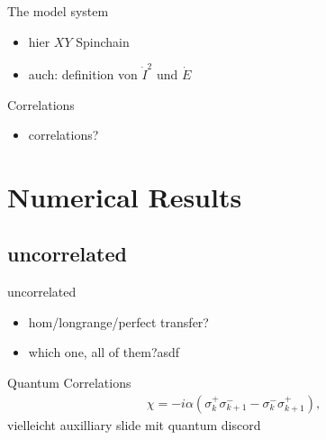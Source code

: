 \documentclass[10pt]{beamer}
\begin{document}
\begin{frame}{The model system}
    \begin{itemize}
        \item hier $XY$ Spinchain
        \item auch: definition von $\dot{I}^2$ und $\dot{E}$
    \end{itemize}
\end{frame}

\begin{frame}{Correlations}
    \begin{itemize}
        \item correlations?
    \end{itemize}
\end{frame}

\section[Numerical Results]{Numerical Results}

\subsection{uncorrelated}

\begin{frame}{uncorrelated}
    \begin{itemize}
        \item hom/longrange/perfect transfer?
        \item which one, all of them?asdf
    \end{itemize}
\end{frame}


\begin{frame}{Quantum Correlations}
    \begin{align}\label{eq:kaonans-corr}
        \chi = -i\alpha(\sigma^+_k \sigma^-_{k+1} - \sigma^-_k \sigma^+_{k+1}),
    \end{align}
    vielleicht auxilliary slide mit quantum discord
\end{frame}
\end{document}
